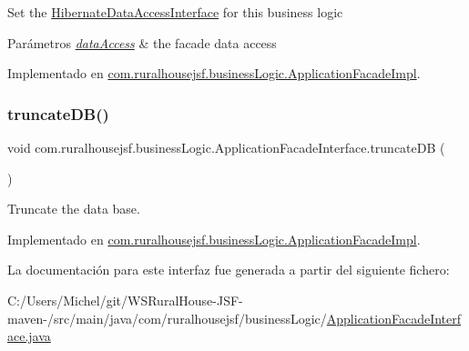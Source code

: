Set the \mbox{\hyperlink{}{Hibernate\+Data\+Access\+Interface}} for this business logic


\begin{DoxyParams}{Parámetros}
{\em \mbox{\hyperlink{namespacecom_1_1ruralhousejsf_1_1data_access}{data\+Access}}} & the facade data access \\
\hline
\end{DoxyParams}


Implementado en \mbox{\hyperlink{classcom_1_1ruralhousejsf_1_1business_logic_1_1_application_facade_impl_a78fc6968b9fec7aa475b322463b6bd92}{com.\+ruralhousejsf.\+business\+Logic.\+Application\+Facade\+Impl}}.

\mbox{\label{interfacecom_1_1ruralhousejsf_1_1business_logic_1_1_application_facade_interface_aeb85aa3c5dd08bc15e08cc0d4c36882e}} 
\subsubsection{\texorpdfstring{truncateDB()}{truncateDB()}}
{\footnotesize\ttfamily void com.\+ruralhousejsf.\+business\+Logic.\+Application\+Facade\+Interface.\+truncate\+DB (\begin{DoxyParamCaption}{ }\end{DoxyParamCaption})}

Truncate the data base. 

Implementado en \mbox{\hyperlink{classcom_1_1ruralhousejsf_1_1business_logic_1_1_application_facade_impl_a5fe9f44c95b3459fb8999c26e5b934cb}{com.\+ruralhousejsf.\+business\+Logic.\+Application\+Facade\+Impl}}.



La documentación para este interfaz fue generada a partir del siguiente fichero\+:\begin{DoxyCompactItemize}
\item 
C\+:/\+Users/\+Michel/git/\+W\+S\+Rural\+House-\/\+J\+S\+F-\/maven-\//src/main/java/com/ruralhousejsf/business\+Logic/\mbox{\hyperlink{_application_facade_interface_8java}{Application\+Facade\+Interface.\+java}}\end{DoxyCompactItemize}
